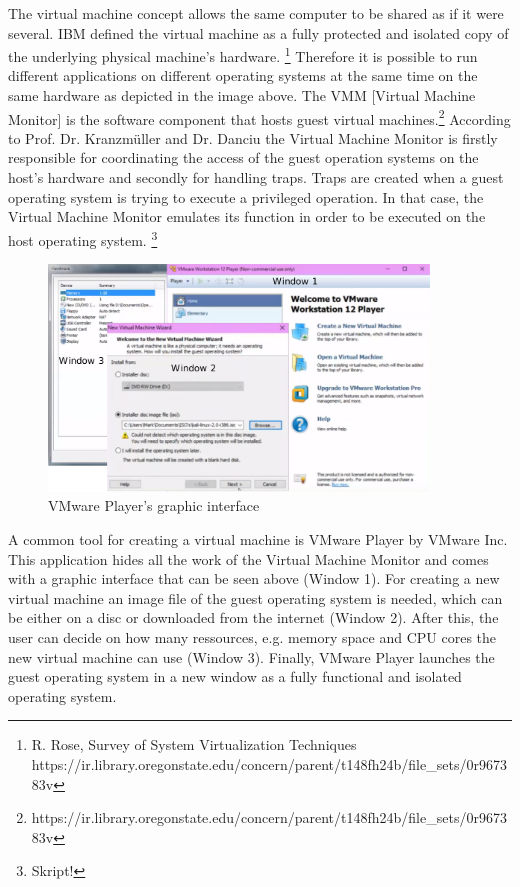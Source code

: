 \documentclass[utf8,biblatex]{lni}
\begin{document}
\glqq The virtual machine concept allows the same computer to be shared as if it were several. IBM defined the virtual machine as a fully protected and isolated copy of the underlying physical machine’s hardware. \glqq\footnote{R. Rose, \glqq Survey of System Virtualization Techniques \glqq https://ir.library.oregonstate.edu/concern/parent/t148fh24b/file_sets/0r967383v} 
Therefore it is possible to run different applications on different operating systems at the same time on the same hardware as depicted in the image above. \glqq The VMM [Virtual Machine Monitor] is the software component that hosts guest virtual machines.\glqq \footnote{https://ir.library.oregonstate.edu/concern/parent/t148fh24b/file_sets/0r967383v} According to Prof. Dr. Kranzmüller and Dr. Danciu the Virtual Machine Monitor is firstly responsible for coordinating the access of the guest operation systems on the host's hardware and secondly for handling traps. Traps are created when a guest operating system is trying to execute a privileged operation. In that case, the Virtual Machine Monitor emulates its function in order to be executed on the host operating system. \footnote{Skript!}

\begin{figure}
  \centering
  \includegraphics[width=0.9\textwidth]{VMware Player.pdf}
  \caption{VMware Player's graphic interface}
  \label{img:VMwarePlayer}
\end{figure}

A common tool for creating a virtual machine is VMware Player by VMware Inc. This application hides all the work of the Virtual Machine Monitor and comes with a graphic interface that can be seen above (Window 1). For creating a new virtual machine an image file of the guest operating system is needed, which can be either on a disc or downloaded from the internet (Window 2). After this, the user can decide on how many ressources, e.g. memory space and CPU cores the new virtual machine can use (Window 3). Finally, VMware Player launches the guest operating system in a new window as a fully functional and isolated operating system.
\end{document}
